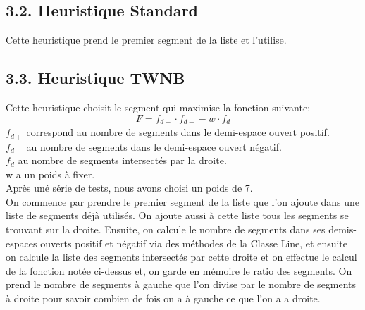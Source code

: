 \documentclass[a4paper,12pt]{report}	%
\begin{document}
    {\subsection*{3.2. Heuristique Standard}}
    Cette heuristique prend le premier segment de la liste et l'utilise.\\
    
    {\subsection*{3.3. Heuristique TWNB}}
    Cette heuristique choisit le segment qui maximise la fonction suivante:
    \begin{equation}
    F = f_{d+} \cdot f_{d-} - w \cdot f_d
    \end{equation}
    $f_{d+}$ correspond au nombre de segments dans le demi-espace ouvert positif.\\
    $f_{d-}$ au nombre de segments dans le demi-espace ouvert négatif.\\
    $f_{d}$ au nombre de segments intersectés par la droite. \\
    w a un poids à fixer. \\
    Après uné série de tests, nous avons choisi un poids de 7.\\

    On commence par prendre le premier segment de la liste que l'on ajoute dans une liste de segments déjà utilisés. On ajoute aussi à cette liste
    tous les segments se trouvant sur la droite. Ensuite, on calcule le nombre de segments dans ses demis-espaces ouverts positif et négatif via
    des méthodes de la Classe Line, et ensuite on calcule la liste des segments intersectés par cette droite et on effectue le calcul de la fonction
    notée ci-dessus et, on garde en mémoire le ratio des segments. On prend le nombre de segments à gauche que l'on divise par le nombre de segments
    à droite pour savoir combien de fois on a à gauche ce que l'on a a droite.\\
\end{document}
